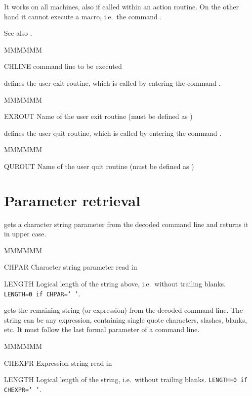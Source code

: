 It works on all machines, also if called within an action routine.
On the other hand it cannot execute a macro, i.e.\ the command .

See also .
\Pdesc\begin{DLtt}{MMMMMM}
\item[CHLINE] command line to be executed
\end{DLtt}

\Vskip{}
\Action defines the user exit routine, which is called by entering the command 
.
\Pdesc\begin{DLtt}{MMMMMM}
\item[EXROUT] Name of the user exit routine (must be defined as )
\end{DLtt}

\Action defines the user quit routine, which is called by entering the command 
.
\Pdesc\begin{DLtt}{MMMMMM}
\item[QUROUT] Name of the user quit routine (must be defined as )
\end{DLtt}


\section{Parameter retrieval}

\Action gets a character string parameter from the decoded command line
and returns it in upper case.
\Pdesc\begin{DLtt}{MMMMMM}
\item[CHPAR] Character string parameter read in
\item[LENGTH] Logical length of the string above, i.e.\ without
trailing blanks.
{\tt LENGTH=0 if CHPAR=' '}.
\end{DLtt}

\Action gets the remaining string (or expression) from the
decoded command line.
The string can be any expression, containing single quote characters,
slashes, blanks, etc.
It must follow the last formal parameter of a command line.
\Pdesc\begin{DLtt}{MMMMMM}
\item[CHEXPR] Expression string read in
\item[LENGTH] Logical length of the string,
i.e.\ without trailing blanks.
{\tt LENGTH=0 if CHEXPR=' '}.
\end{DLtt}

